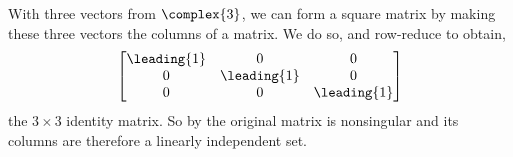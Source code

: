 With three vectors from $\complex{3}$, we can form a square matrix by making these three vectors the columns of a matrix.  We do so, and row-reduce to obtain,
%
\begin{equation*}
\begin{bmatrix}
\leading{1} & 0 & 0\\
0 & \leading{1} & 0\\ 
0 & 0 & \leading{1}
\end{bmatrix}
\end{equation*}
%
the $3\times 3$ identity matrix.  So by  the original matrix is nonsingular and its columns are therefore a linearly independent set.
